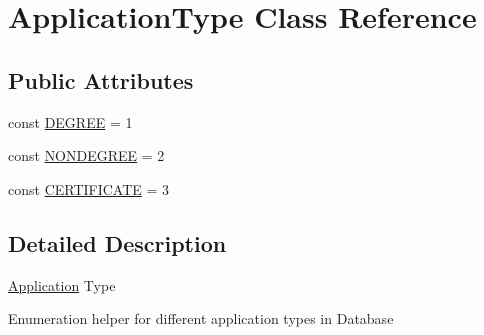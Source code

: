 \hypertarget{class_application_type}{\section{Application\-Type Class Reference}
\label{class_application_type}
}
\subsection*{Public Attributes}
\begin{DoxyCompactItemize}
\item 
const \hyperlink{class_application_type_a97fb740c9a478311ae614507b11f42d6}{D\-E\-G\-R\-E\-E} = 1
\item 
const \hyperlink{class_application_type_a1049360b5c4e6811bd8d75c7de7792b1}{N\-O\-N\-D\-E\-G\-R\-E\-E} = 2
\item 
const \hyperlink{class_application_type_aa47002a4e563f65b4475f50a803669a5}{C\-E\-R\-T\-I\-F\-I\-C\-A\-T\-E} = 3
\end{DoxyCompactItemize}


\subsection{Detailed Description}
\hyperlink{class_application}{Application} Type

Enumeration helper for different application types in Database 

